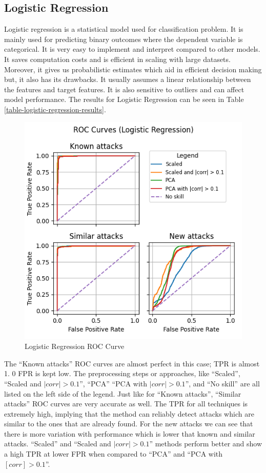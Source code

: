 \subsection{Logistic Regression}
Logistic regression is a statistical model used for classification problem. It is mainly used for predicting binary outcomes where the dependent variable is categorical. It is very easy to implement and interpret compared to other models. It saves computation costs and is efficient in scaling with large datasets. Moreover, it gives us probabilistic estimates which aid in efficient decision making but, it also has its drawbacks. It usually assumes a linear relationship between the features and target features. It is also sensitive to outliers and can affect model performance.
The results for Logistic Regression can be seen in Table \ref{table-logistic-regression-results}.
\begin{figure}
    \centering
    \includegraphics[width=\linewidth]{figures/Logistic Regression_roc_all_small.png}
    \caption{Logistic Regression ROC Curve}
    \label{fig:logreg_roc}
\end{figure}


The ``Known attacks'' ROC curves are almost perfect in this case; TPR is almost 1. 0 FPR is kept low. The preprocessing steps or approaches, like ``Scaled'', ``Scaled and $|corr| > 0. 1$'', ``PCA'' ``PCA with $|corr| > 0.1$'', and ``No skill'' are all listed on the left side of the legend. Just like for ``Known attacks'', ``Similar attacks'' ROC curves are very accurate as well. The TPR for all techniques is extremely high, implying that the method can reliably detect attacks which are similar to the ones that are already found. For the new attacks we can see that there is more variation with performance which is lower that known and similar attacks. ``Scaled'' and ``Scaled and $|corr| > 0.1$'' methods perform better and show a high TPR at lower FPR when compared to ``PCA'' and ``PCA with $[corr] > 0.1$''.




